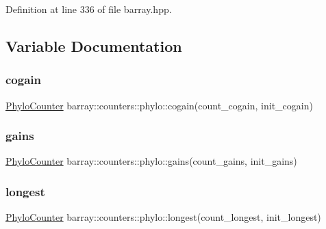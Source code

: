 Definition at line 336 of file barray.\+hpp.



\subsection{Variable Documentation}
\mbox{\label{namespacebarray_1_1counters_1_1phylo_a78228f029d2d6628916e9cead3c99417}} 
\subsubsection{\texorpdfstring{cogain}{cogain}}
{\footnotesize\ttfamily \hyperlink{namespacebarray_1_1counters_1_1phylo_a89311b835ee762505a62d6cadbd6704b}{Phylo\+Counter} barray\+::counters\+::phylo\+::cogain(count\+\_\+cogain, init\+\_\+cogain)}

\mbox{\label{namespacebarray_1_1counters_1_1phylo_a336b5016496abb570c383526a012cb48}} 
\subsubsection{\texorpdfstring{gains}{gains}}
{\footnotesize\ttfamily \hyperlink{namespacebarray_1_1counters_1_1phylo_a89311b835ee762505a62d6cadbd6704b}{Phylo\+Counter} barray\+::counters\+::phylo\+::gains(count\+\_\+gains, init\+\_\+gains)}

\mbox{\label{namespacebarray_1_1counters_1_1phylo_aca6c924c86a532ee99309016c285afa2}} 
\subsubsection{\texorpdfstring{longest}{longest}}
{\footnotesize\ttfamily \hyperlink{namespacebarray_1_1counters_1_1phylo_a89311b835ee762505a62d6cadbd6704b}{Phylo\+Counter} barray\+::counters\+::phylo\+::longest(count\+\_\+longest, init\+\_\+longest)}

